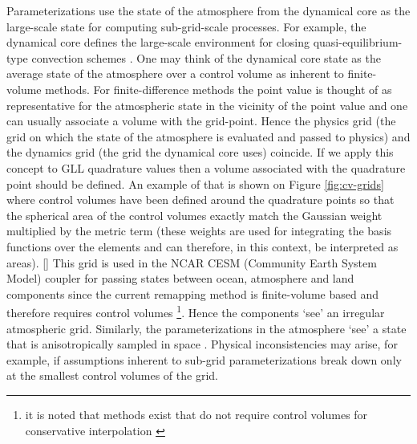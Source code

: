 \documentclass[twocol]{ametsoc}
\begin{document}
Parameterizations use the state of the atmosphere from the dynamical core as the large-scale state for computing sub-grid-scale processes. For example, the dynamical core defines the large-scale environment for closing quasi-equilibrium-type convection schemes \citep{AS1974JAS}. One may think of the dynamical core state as the average state of the atmosphere over a control volume as inherent to finite-volume methods. For finite-difference methods the point value is thought of as representative for the atmospheric state in the vicinity of the point value and one can usually associate a volume with the grid-point. Hence the physics grid (the grid on which the state of the atmosphere is evaluated and passed to physics) and the dynamics grid (the grid the dynamical core uses) coincide. If we apply this concept to GLL quadrature values then a volume associated with the quadrature point should be defined. An example of that is shown on Figure \ref{fig:cv-grids} where control volumes have been defined around the quadrature points so that the spherical area of the control volumes exactly match the Gaussian weight multiplied by the metric term (these weights are used for integrating the basis functions over the elements and can therefore, in this context, be interpreted as areas). [{\color{red}{Mark: could we be mathematically more rigorous? perhaps an appendix describing the iterative algorithm?}}] This grid is used in the NCAR CESM (Community Earth System Model) coupler for passing states between ocean, atmosphere and land components since the current remapping method is finite-volume based and therefore requires control volumes {\footnote{it is noted that methods exist that do not require control volumes for conservative interpolation \citep{UT2015MWR}}}. Hence the components `see' an irregular atmospheric grid. Similarly, the parameterizations in the atmosphere `see' a state that is anisotropically sampled in space \citep[see Figure 1 and 5 in ][]{KetAl2008JGR}. Physical inconsistencies may arise, for example, if assumptions inherent to sub-grid parameterizations break down only at the smallest control volumes of the grid. 
\end{document}
